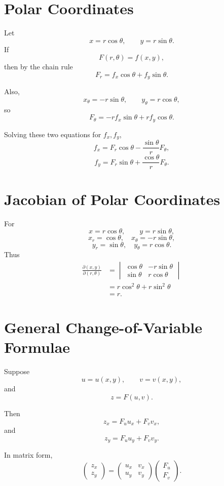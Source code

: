 \documentclass[11pt,oneside]{book}
\theoremstyle{studentthm}
\theoremstyle{definition}
\begin{document}
\section{Polar Coordinates}

Let
\[
x=r\cos\theta,
\qquad
y=r\sin\theta.
\]
If
\[
F(r,\theta)=f(x,y),
\]
then by the chain rule
\[
F_r
=
f_x\cos\theta+f_y\sin\theta.
\]

Also,
\[
x_\theta=-r\sin\theta,
\qquad
y_\theta=r\cos\theta,
\]
so
\[
F_\theta
=
-rf_x\sin\theta
+
rf_y\cos\theta.
\]

Solving these two equations for \(f_x,f_y\),
\[
f_x
=
F_r\cos\theta
-
\frac{\sin\theta}{r}F_\theta,
\]
\[
f_y
=
F_r\sin\theta
+
\frac{\cos\theta}{r}F_\theta.
\]

\section{Jacobian of Polar Coordinates}

For
\[
x=r\cos\theta,\qquad y=r\sin\theta,
\]
\[
x_r=\cos\theta,
\quad
x_\theta=-r\sin\theta,
\]
\[
y_r=\sin\theta,
\quad
y_\theta=r\cos\theta.
\]
Thus
\[
\begin{aligned}
\frac{\partial(x,y)}{\partial(r,\theta)}
&=
\begin{vmatrix}
\cos\theta&-r\sin\theta\\
\sin\theta&r\cos\theta
\end{vmatrix}\\
&=
r\cos^2\theta+r\sin^2\theta\\
&=r.
\end{aligned}
\]


\section{General Change-of-Variable Formulae}

Suppose
\[
u=u(x,y),
\qquad
v=v(x,y),
\]
and
\[
z=F(u,v).
\]

Then
\[
z_x=F_u u_x+F_v v_x,
\]
and
\[
z_y=F_u u_y+F_v v_y.
\]

In matrix form,
\[
\begin{pmatrix}
z_x\\
z_y
\end{pmatrix}
=
\begin{pmatrix}
u_x&v_x\\
u_y&v_y
\end{pmatrix}
\begin{pmatrix}
F_u\\
F_v
\end{pmatrix}.
\]
\end{document}
